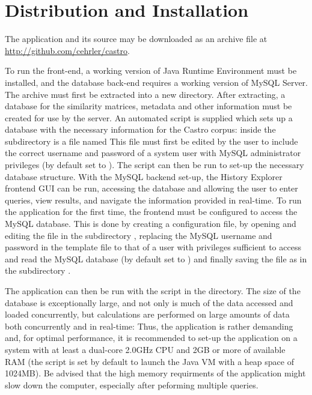 \section{Distribution and Installation}
The application and its source may be downloaded as an archive file at \url{http://github.com/cehrler/castro}.

To run the front-end, a working version of Java Runtime Environment must be installed, and the
database back-end requires a working version of MySQL Server. The archive must first be extracted
into a new directory. After extracting, a database for the similarity matrices, metadata and other
information must be created for use by the server. An automated script is supplied which sets up a
database with the necessary information for the Castro corpus: inside the 
subdirectory is a file named  This file must first be edited by the user to
include the correct username and password of a system user with MySQL administrator privileges (by
default set to ). The script can then be run to set-up the necessary database structure.
With the MySQL backend set-up, the History Explorer frontend GUI can be run, accessing the database
and allowing the user to enter queries, view results, and navigate the information provided in
real-time. To run the application for the first time, the frontend must be configured to access the
MySQL database. This is done by creating a configuration file, by opening and editing the file
 in the subdirectory , replacing the MySQL username
and password in the template file to that of a user with privileges sufficient to access and read
the MySQL database (by default set to ) and finally saving the file as 
in the subdirectory .

The application can then be run with the script  in the 
directory. The size of the database is exceptionally large, and not only is much of the data
accessed and loaded concurrently, but calculations are performed on large amounts of data both
concurrently and in real-time: Thus, the application is rather demanding and, for optimal
performance, it is recommended to set-up the application on a system with at least a dual-core
2.0GHz CPU and 2GB or more of available RAM (the script is set by default to launch the Java VM with
a heap space of 1024MB). Be advised that the high memory requirments of the application might slow
down the computer, especially after peforming multiple queries.

